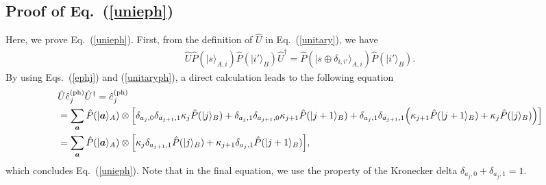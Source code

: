 \documentclass[prl,twocolumn,superscriptaddress,nofootinbib]{revtex4}
\def\U#1{{\rm #1}}
\newcommand{\ket}[1]{| #1 \rangle}
\begin{document}
\begin{widetext}

  \section{Proof of Eq.~(\ref{unieph})}
  \label{sec:apA}
      Here, we prove Eq.~(\ref{unieph}). First, from the definition of $\hat{U}$ in Eq.~(\ref{unitary}), we have
      \begin{align}
        \hat{U}\hat{P}(\ket{s}_{A,i})\hat{P}(\ket{i'}_B)\hat{U}^{\dagger}
        =\hat{P}(\ket{s\oplus \delta_{i,i'}}_{A,i})\hat{P}(\ket{i'}_{B}).
        \label{unitaryph}
      \end{align}
      By using Eqs.~(\ref{ephj}) and (\ref{unitaryph}), a direct calculation leads to the following equation
      \begin{align}
  &\hat{U}\hat{e}^{(\U{ph})}_{j}\hat{U}^{\dagger}=\hat{e}^{(\U{ph})}_{j}\notag\\
        &=\sum_{{\bm{a}}}\hat{P}(\ket{{\bm{a}}}_A)\otimes\Big[
          \delta_{a_j,0}\delta_{a_{j+1},1}\kappa_{j}\hat{P}(\ket{j}_B)
          +\delta_{a_j,1}\delta_{a_{j+1},0}\kappa_{j+1}\hat{P}(\ket{j+1}_B)
          +\delta_{a_j,1}\delta_{a_{j+1},1}\Big(\kappa_{j+1}\hat{P}(\ket{j+1}_B)+\kappa_{j}\hat{P}(\ket{j}_B)\Big)
          \Big]\notag\\
        &=\sum_{{\bm{a}}}\hat{P}(\ket{{\bm{a}}}_A)\otimes
  \Big[\kappa_j
    \delta_{a_{j+1},1}\hat{P}(\ket{j}_B)+\kappa_{j+1}\delta_{a_j,1}\hat{P}(\ket{j+1}_B)\Big],
      \end{align}
      which concludes Eq.~(\ref{unieph}).
      Note that in the final equation, we use the property of the Kronecker delta 
      $\delta_{a_{j},0}+\delta_{a_{j},1}=1$. 


\end{widetext}
\end{document}
